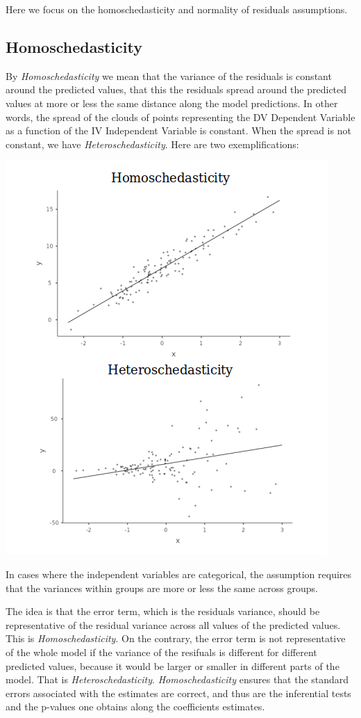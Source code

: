 \documentclass[
]{book}
\begin{document}
Here we focus on the homoschedasticity and normality of residuals assumptions.

\hypertarget{homosched}{%
\subsection{Homoschedasticity}\label{homosched}}

By \emph{Homoschedasticity} we mean that the variance of the residuals is constant around the predicted values, that this the residuals spread around the predicted values at more or less the same distance along the model predictions. In other words, the spread of the clouds of points representing the {DV {Dependent Variable} } as a function of the {IV {Independent Variable} } is constant. When the spread is not constant, we have \emph{Heteroschedasticity}. Here are two exemplifications:

\includegraphics{bookletpics/2_assumptions_theory1.png}

In cases where the independent variables are categorical, the assumption requires that the variances within groups are more or less the same across groups.

The idea is that the error term, which is the residuals variance, should be representative of the residual variance across all values of the predicted values. This is \emph{Homoschedasticity}. On the contrary, the error term is not representative of the whole model if the variance of the resifuals is different for different predicted values, because it would be larger or smaller in different parts of the model. That is \emph{Heteroschedasticity}. \emph{Homoschedasticity} ensures that the standard errors associated with the estimates are correct, and thus are the inferential tests and the p-values one obtains along the coefficients estimates.
\end{document}
